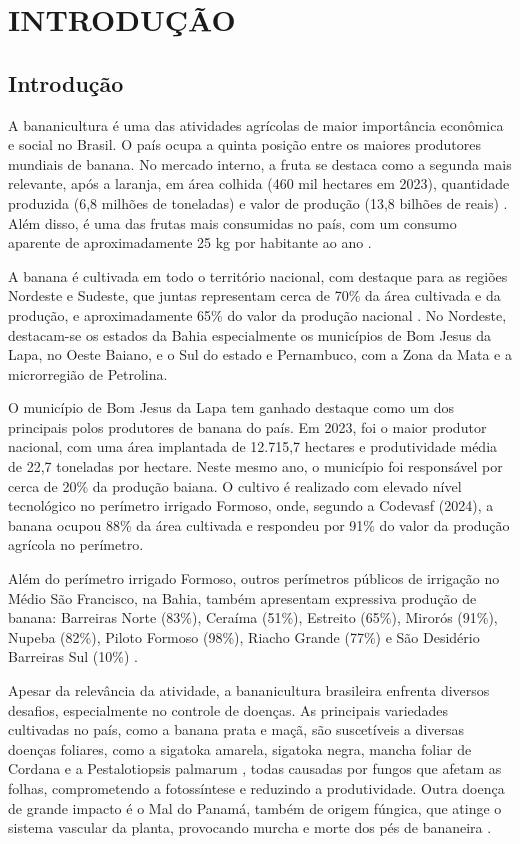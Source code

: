 
\chapter{INTRODUÇÃO}{}

 \section{Introdução}

A bananicultura é uma das atividades agrícolas de maior importância econômica e social no Brasil. O país ocupa a quinta posição entre os maiores produtores mundiais de banana. No mercado interno, a fruta se destaca como a segunda mais relevante, após a laranja, em área colhida (460 mil hectares em 2023), quantidade produzida (6,8 milhões de toneladas) e valor de produção (13,8 bilhões de reais) \cite{KULEF2024}. Além disso, é uma das frutas mais consumidas no país, com um consumo aparente de aproximadamente 25 kg por habitante ao ano \cite{KULEF2024}.

A banana é cultivada em todo o território nacional, com destaque para as regiões Nordeste e Sudeste, que juntas representam cerca de 70\% da área cultivada e da produção, e aproximadamente 65\% do valor da produção nacional \cite{KULEF2024}. No Nordeste, destacam-se os estados da Bahia  especialmente os municípios de Bom Jesus da Lapa, no Oeste Baiano, e o Sul do estado  e Pernambuco, com a Zona da Mata e a microrregião de Petrolina.

O município de Bom Jesus da Lapa tem ganhado destaque como um dos principais polos produtores de banana do país. Em 2023, foi o maior produtor nacional, com uma área implantada de 12.715,7 hectares e produtividade média de 22,7 toneladas por hectare. Neste mesmo ano, o município foi responsável por cerca de 20\% da produção baiana. O cultivo é realizado com elevado nível tecnológico no perímetro irrigado Formoso, onde, segundo a Codevasf (2024), a banana ocupou 88\% da área cultivada e respondeu por 91\% do valor da produção agrícola no perímetro.

Além do perímetro irrigado Formoso, outros perímetros públicos de irrigação no Médio São Francisco, na Bahia, também apresentam expressiva produção de banana: Barreiras Norte (83\%), Ceraíma (51\%), Estreito (65\%), Mirorós (91\%), Nupeba (82\%), Piloto Formoso (98\%), Riacho Grande (77\%) e São Desidério Barreiras Sul (10\%) \cite{Codevasf2024}.

Apesar da relevância da atividade, a bananicultura brasileira enfrenta diversos desafios, especialmente no controle de doenças. As principais variedades cultivadas no país, como a banana prata e maçã, são suscetíveis a diversas doenças foliares, como a sigatoka amarela, sigatoka negra, mancha foliar de Cordana e a Pestalotiopsis palmarum \cite{KULEF2024}, todas causadas por fungos que afetam as folhas, comprometendo a fotossíntese e reduzindo a produtividade. Outra doença de grande impacto é o Mal do Panamá, também de origem fúngica, que atinge o sistema vascular da planta, provocando murcha e morte dos pés de bananeira \cite{CORDEIRO2017}.

